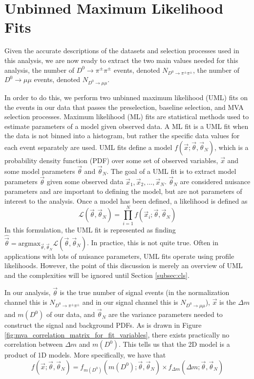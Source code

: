 \section{Unbinned Maximum Likelihood Fits}
\label{sec:UML}

Given the accurate descriptions of the datasets and selection processes used in this analysis, we are now ready to extract the two main values needed for this analysis, the number of $D^0 \to \pi^\pm \pi^\pm$ events, denoted $N_{D^0 \to \pi^\pm \pi^\pm}$, the number of $D^0 \to \mu \mu$ events, denoted $N_{D^0 \to \mu \mu}$.

In order to do this, we perform two unbinned maximum likelihood (UML) fits on the events in our data that passes the preselection, baseline selection, and MVA selection processes. Maximum likelihood (ML) fits are statistical methods used to estimate parameters of a model given observed data. A ML fit is a UML fit when the data is not binned into a histogram, but rather the specific data values for each event separately are used. UML fits define a model $f(\vec{x}; \vec{\theta}, \vec{\theta}_N)$, which is a probability density function (PDF) over some set of observed variables, $\vec{x}$ and some model parameters $\vec{\theta}$ and $\vec{\theta}_N$. The goal of a UML fit is to extract model parameters $\vec{\theta}$ given some observed data $\vec{x}_1, \vec{x}_2,...,\vec{x}_N$. $\vec{\theta}_N$ are considered nuisance parameters and are important to defining the model, but are not parameters of interest to the analysis. Once a model has been defined, a likelihood is defined as
\begin{equation}
    \mathcal{L}(\vec{\theta}, \vec{\theta}_N) = \prod^N_{i=1} f(\vec{x}_i; \vec{\theta}, \vec{\theta}_N)
\end{equation}
In this formulation, the UML fit is represented as finding $\hat{\vec{\theta}} = \text{argmax}_{\vec{\theta}, \vec{\theta}_N} \mathcal{L}(\vec{\theta}, \vec{\theta}_N)$. In practice, this is not quite true. Often in applications with lots of nuisance parameters, UML fits operate using profile likelihoods. However, the point of this discussion is merely an overview of UML and the complexities will be ignored until Section \ref{subsec:cls}. 

In our analysis, $\vec{\theta}$ is the true number of signal events (in the normalization channel this is $N_{D^0 \to \pi^\pm \pi^\pm}$ and in our signal channel this is $N_{D^0 \to \mu \mu}$), $\vec{x}$ is the $\Delta m$ and $m(D^0)$ of our data, and $\vec{\theta}_N$ are the variance parameters needed to construct the signal and background PDFs. As is drawn in Figure \ref{fig:mva_correlation_matrix_for_fit_variables}, there exists practically no correlation between $\Delta m$ and $m(D^0)$. This tells us that the 2D model is a product of 1D models. More specifically, we have that
\begin{equation}
    f(\vec{x}; \vec{\theta}, \vec{\theta}_N) = f_{m(D^0)}(m(D^0); \vec{\theta}, \vec{\theta}_N) \times f_{\Delta m}(\Delta m; \vec{\theta}, \vec{\theta}_N)
\end{equation}

